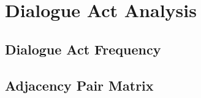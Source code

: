 \section{Dialogue Act Analysis}
\subsection{Dialogue Act Frequency}
\subsection{Adjacency Pair Matrix}